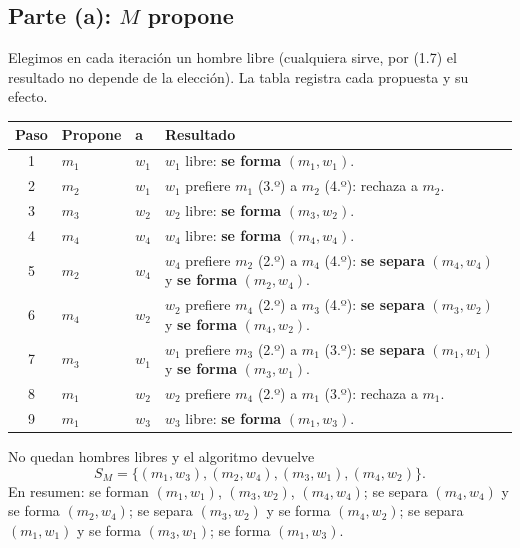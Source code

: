 \subsection*{Parte (a): $M$ propone}
Elegimos en cada iteración un hombre libre (cualquiera sirve, por (1.7) el resultado no
depende de la elección). La tabla registra cada propuesta y su efecto.
\begin{center}
\begin{tabular}{cllp{7.5cm}}
\toprule
Paso & Propone & a & Resultado \\
\midrule
1 & $m_1$ & $w_1$ & $w_1$ libre: \textbf{se forma} $(m_1,w_1)$.\\
2 & $m_2$ & $w_1$ & $w_1$ prefiere $m_1$ (3.º) a $m_2$ (4.º): rechaza a $m_2$.\\
3 & $m_3$ & $w_2$ & $w_2$ libre: \textbf{se forma} $(m_3,w_2)$.\\
4 & $m_4$ & $w_4$ & $w_4$ libre: \textbf{se forma} $(m_4,w_4)$.\\
5 & $m_2$ & $w_4$ & $w_4$ prefiere $m_2$ (2.º) a $m_4$ (4.º): \textbf{se separa} $(m_4,w_4)$ y \textbf{se forma} $(m_2,w_4)$.\\
6 & $m_4$ & $w_2$ & $w_2$ prefiere $m_4$ (2.º) a $m_3$ (4.º): \textbf{se separa} $(m_3,w_2)$ y \textbf{se forma} $(m_4,w_2)$.\\
7 & $m_3$ & $w_1$ & $w_1$ prefiere $m_3$ (2.º) a $m_1$ (3.º): \textbf{se separa} $(m_1,w_1)$ y \textbf{se forma} $(m_3,w_1)$.\\
8 & $m_1$ & $w_2$ & $w_2$ prefiere $m_4$ (2.º) a $m_1$ (3.º): rechaza a $m_1$.\\
9 & $m_1$ & $w_3$ & $w_3$ libre: \textbf{se forma} $(m_1,w_3)$.\\
\bottomrule
\end{tabular}
\end{center}
No quedan hombres libres y el algoritmo devuelve
\[
S_M=\{(m_1,w_3),(m_2,w_4),(m_3,w_1),(m_4,w_2)\}.
\]
En resumen: se forman $(m_1,w_1)$, $(m_3,w_2)$, $(m_4,w_4)$; se separa $(m_4,w_4)$ y se forma
$(m_2,w_4)$; se separa $(m_3,w_2)$ y se forma $(m_4,w_2)$; se separa $(m_1,w_1)$ y se forma
$(m_3,w_1)$; se forma $(m_1,w_3)$.


